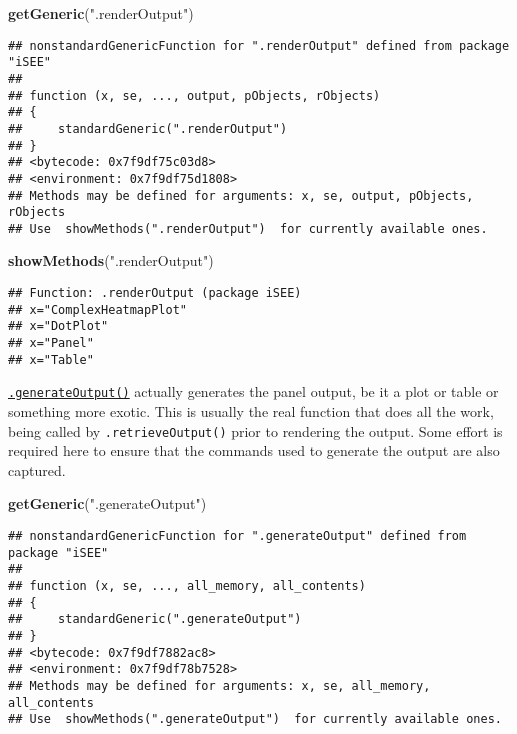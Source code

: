 \documentclass[
]{book}
\newenvironment{Shaded}{\begin{snugshade}}{\end{snugshade}}
\newcommand{\KeywordTok}[1]{\textcolor[rgb]{0.13,0.29,0.53}{\textbf{#1}}}
\newcommand{\NormalTok}[1]{#1}
\newcommand{\StringTok}[1]{\textcolor[rgb]{0.31,0.60,0.02}{#1}}
\begin{document}
\begin{Shaded}
\begin{Highlighting}[]
\KeywordTok{getGeneric}\NormalTok{(}\StringTok{".renderOutput"}\NormalTok{)}
\end{Highlighting}
\end{Shaded}

\begin{verbatim}
## nonstandardGenericFunction for ".renderOutput" defined from package "iSEE"
## 
## function (x, se, ..., output, pObjects, rObjects) 
## {
##     standardGeneric(".renderOutput")
## }
## <bytecode: 0x7f9df75c03d8>
## <environment: 0x7f9df75d1808>
## Methods may be defined for arguments: x, se, output, pObjects, rObjects
## Use  showMethods(".renderOutput")  for currently available ones.
\end{verbatim}

\begin{Shaded}
\begin{Highlighting}[]
\KeywordTok{showMethods}\NormalTok{(}\StringTok{".renderOutput"}\NormalTok{)}
\end{Highlighting}
\end{Shaded}

\begin{verbatim}
## Function: .renderOutput (package iSEE)
## x="ComplexHeatmapPlot"
## x="DotPlot"
## x="Panel"
## x="Table"
\end{verbatim}

\href{https://isee.github.io/iSEE/reference/output-generics.html}{\texttt{.generateOutput()}} actually generates the panel output, be it a plot or table or something more exotic.
This is usually the real function that does all the work, being called by \texttt{.retrieveOutput()} prior to rendering the output.
Some effort is required here to ensure that the commands used to generate the output are also captured.

\begin{Shaded}
\begin{Highlighting}[]
\KeywordTok{getGeneric}\NormalTok{(}\StringTok{".generateOutput"}\NormalTok{)}
\end{Highlighting}
\end{Shaded}

\begin{verbatim}
## nonstandardGenericFunction for ".generateOutput" defined from package "iSEE"
## 
## function (x, se, ..., all_memory, all_contents) 
## {
##     standardGeneric(".generateOutput")
## }
## <bytecode: 0x7f9df7882ac8>
## <environment: 0x7f9df78b7528>
## Methods may be defined for arguments: x, se, all_memory, all_contents
## Use  showMethods(".generateOutput")  for currently available ones.
\end{verbatim}
\end{document}
